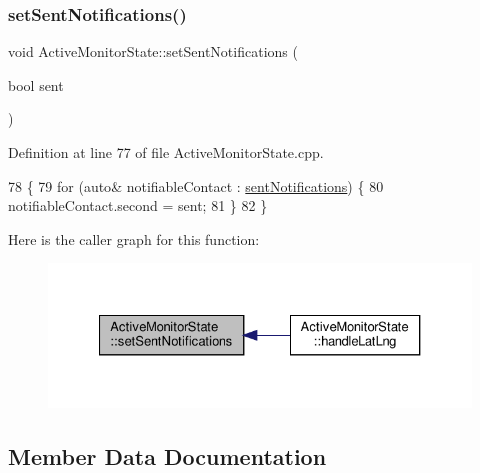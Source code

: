 \mbox{\label{class_active_monitor_state_adedd023d280922991a5dd980017549ec}} 
\subsubsection{\texorpdfstring{set\+Sent\+Notifications()}{setSentNotifications()}}
{\footnotesize\ttfamily void Active\+Monitor\+State\+::set\+Sent\+Notifications (\begin{DoxyParamCaption}\item[{bool}]{sent }\end{DoxyParamCaption})\hspace{0.3cm}{\ttfamily [private]}}



Definition at line 77 of file Active\+Monitor\+State.\+cpp.


\begin{DoxyCode}
78 \{
79     \textcolor{keywordflow}{for} (\textcolor{keyword}{auto}& notifiableContact : \hyperlink{class_active_monitor_state_a25493a87079926faf7d03b8587ad9f62}{sentNotifications}) \{
80         notifiableContact.second = sent;
81     \}
82 \}
\end{DoxyCode}
Here is the caller graph for this function\+:\nopagebreak
\begin{figure}[H]
\begin{center}
\leavevmode
\includegraphics[width=327pt]{d9/db8/class_active_monitor_state_adedd023d280922991a5dd980017549ec_icgraph}
\end{center}
\end{figure}


\subsection{Member Data Documentation}
\mbox{\label{class_active_monitor_state_af4c93e1be350ea9cf4ac97f97abaf79e}} 
